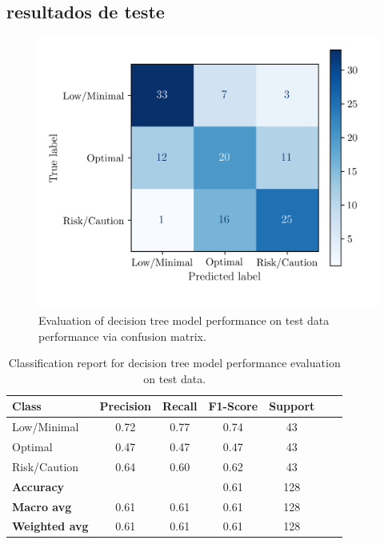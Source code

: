 \documentclass[conference]{IEEEtran}
\begin{document}
\subsection{resultados de teste}

\begin{figure}[H]
    \centering
    \includegraphics[width=1\linewidth]{assets/DTREE_ConfusionMatrixTest.png}
    \caption{Evaluation of decision tree model performance on test data performance via confusion matrix.}
    \label{dtree_cmtest}
\end{figure}

\begin{table}[H]
\centering
\caption{Classification report for decision tree model performance evaluation on test data.}
\label{cr_dtree_test}
\begin{tabular}{lcccccc}
\toprule
\textbf{Class} & \textbf{Precision} & \textbf{Recall} & \textbf{F1-Score} & \textbf{Support} \\
\midrule
Low/Minimal & 0.72 & 0.77 & 0.74 & 43 \\
Optimal & 0.47 & 0.47 & 0.47 & 43 \\
Risk/Caution & 0.64 & 0.60 & 0.62 & 43 \\
\midrule
\textbf{Accuracy} &  &  & 0.61 & 128 \\
\textbf{Macro avg} & 0.61 & 0.61 & 0.61 & 128 \\
\textbf{Weighted avg} & 0.61 & 0.61 & 0.61 & 128 \\
\bottomrule
\end{tabular}
\end{table}
\end{document}
